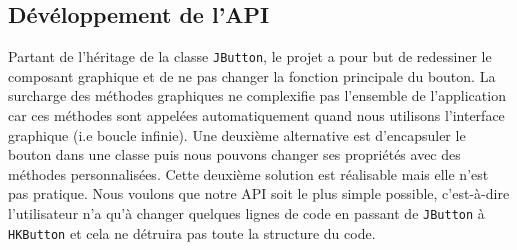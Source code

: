 \documentclass[12pt,a4paper]{article}
\begin{document}
\subsection{Dévéloppement de l'API}
Partant de l'héritage de la classe \texttt{JButton}, le projet a pour but de redessiner le composant graphique et de ne pas changer la fonction principale du bouton. La surcharge des méthodes graphiques ne complexifie pas l'ensemble de l'application car ces méthodes sont appelées automatiquement quand nous utilisons l'interface graphique (i.e boucle infinie). Une deuxième alternative est d'encapsuler le bouton dans une classe puis nous pouvons changer ses propriétés avec des méthodes personnalisées. Cette deuxième solution est réalisable mais elle n'est pas pratique. Nous voulons que notre API soit le plus simple possible, c'est-à-dire l'utilisateur n'a qu'à changer quelques lignes de code en passant de \texttt{JButton} à \texttt{HKButton} et cela ne détruira pas toute la structure du code.
\end{document}
